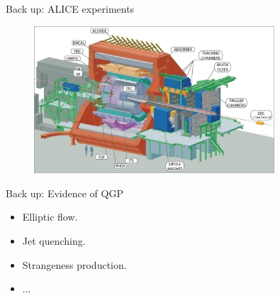\documentclass[11pt]{beamer}
\begin{document}
\begin{frame}[noframenumbering]{Back up: ALICE experiments}
\begin{center}
\begin{figure}
\includegraphics[width=0.8\textwidth]{./pics/ALICE-detector.jpg}
\end{figure}
\end{center}
\end{frame}

\begin{frame}[noframenumbering]{Back up: Evidence of QGP}
\begin{itemize}
\item Elliptic flow.
\item Jet quenching.
\item Strangeness production.
\item ...
\end{itemize}
\end{frame}
\end{document}
